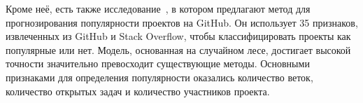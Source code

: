 Кроме неё, есть также исследование~\cite{HanDXWY19}, в котором предлагают метод для прогнозирования популярности проектов на GitHub. Он использует 35 признаков, извлеченных из GitHub и Stack Overflow, чтобы классифицировать проекты как популярные или нет. Модель, основанная на случайном лесе, достигает высокой точности значительно превосходит существующие методы. Основными признаками для определения популярности оказались количество веток, количество открытых задач и количество участников проекта.